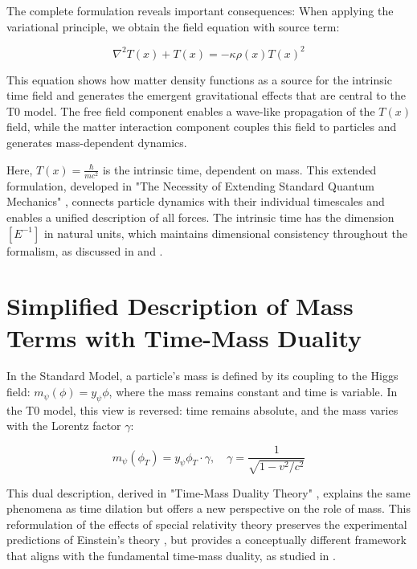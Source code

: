 \documentclass[a4paper,12pt]{article}
\newcommand{\Tfield}{T(x)}
\begin{document}
	The complete formulation reveals important consequences: When applying the variational principle, we obtain the field equation with source term:
	
	\begin{equation}
		\nabla^2 \Tfield + \Tfield = -\kappa\rho(x)\Tfield^2
	\end{equation}
	
	This equation shows how matter density functions as a source for the intrinsic time field and generates the emergent gravitational effects that are central to the T0 model. The free field component enables a wave-like propagation of the $\Tfield$ field, while the matter interaction component couples this field to particles and generates mass-dependent dynamics.
	
	Here, $\Tfield = \frac{\hbar}{m c^2}$ is the intrinsic time, dependent on mass. This extended formulation, developed in "The Necessity of Extending Standard Quantum Mechanics" \cite{pascher_erweiterung_2025}, connects particle dynamics with their individual timescales and enables a unified description of all forces. The intrinsic time has the dimension $[E^{-1}]$ in natural units, which maintains dimensional consistency throughout the formalism, as discussed in \cite{pascher_alpha_2025} and \cite{pascher_alphabeta_2025}.
	
	\section{Simplified Description of Mass Terms with Time-Mass Duality}
	
	In the Standard Model, a particle's mass is defined by its coupling to the Higgs field: $m_\psi(\phi) = y_\psi \phi$, where the mass remains constant and time is variable. In the T0 model, this view is reversed: time remains absolute, and the mass varies with the Lorentz factor $\gamma$:
	
	\begin{equation}
		m_\psi(\phi_T) = y_\psi \phi_T \cdot \gamma, \quad \gamma = \frac{1}{\sqrt{1 - v^2/c^2}}
	\end{equation}
	
	This dual description, derived in "Time-Mass Duality Theory" \cite{pascher_params_2025}, explains the same phenomena as time dilation but offers a new perspective on the role of mass. This reformulation of the effects of special relativity theory preserves the experimental predictions of Einstein's theory \cite{einstein1905}, but provides a conceptually different framework that aligns with the fundamental time-mass duality, as studied in \cite{pascher_zeit_masse_2025}.
	
\end{document}
